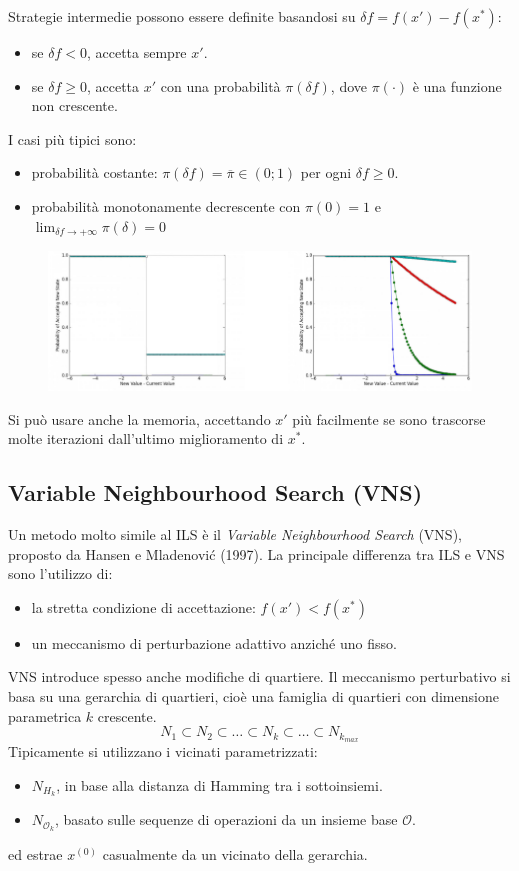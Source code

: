\documentclass{article}
\begin{document}
Strategie intermedie possono essere definite basandosi su $\delta f =f(x')-f(x^*)$:
\begin{itemize}
    \item se $\delta f<0$, accetta sempre $x'$.
    \item se $\delta f\geq 0$, accetta $x'$ con una probabilità $\pi(\delta f)$, dove
    $\pi(\cdot)$ è una funzione non crescente.
\end{itemize}
I casi più tipici sono:
\begin{itemize}
    \item probabilità costante: $\pi(\delta f)=\overline{\pi}\in(0;1)$ per ogni $\delta f\geq 0$.
    \item probabilità monotonamente decrescente con $\pi(0)=1$ e $\lim_{\delta f\rightarrow+\infty}\pi(\delta)=0$
\end{itemize}
\begin{figure}[H]
    \centering
    \includegraphics[scale=0.6]{images/acceptcond.png}
\end{figure}
Si può usare anche la memoria, accettando $x'$ più facilmente se sono trascorse molte iterazioni
dall'ultimo miglioramento di $x^*$.

\subsection{Variable Neighbourhood Search (VNS)}
Un metodo molto simile al ILS è il \textit{Variable Neighbourhood Search} (VNS), proposto
da Hansen e Mladenović (1997). La principale differenza tra ILS e VNS sono l'utilizzo di:
\begin{itemize}
    \item la stretta condizione di accettazione: $f(x')<f(x^*)$
    \item un meccanismo di perturbazione adattivo anziché uno fisso.
\end{itemize}
VNS introduce spesso anche modifiche di quartiere. Il meccanismo perturbativo si basa
su una gerarchia di quartieri, cioè una famiglia di quartieri con dimensione
parametrica $k$ crescente.
$$N_1\subset N_2\subset\dots \subset N_k\subset\dots\subset N_{k_{max}}$$
Tipicamente si utilizzano i vicinati parametrizzati:
\begin{itemize}
    \item $N_{H_k}$, in base alla distanza di Hamming tra i sottoinsiemi.
    \item $N_{\mathcal{O}_k}$, basato sulle sequenze di operazioni da un insieme base $\mathcal{O}$.
\end{itemize}
ed estrae $x^{(0)}$ casualmente da un vicinato della gerarchia.
\end{document}
